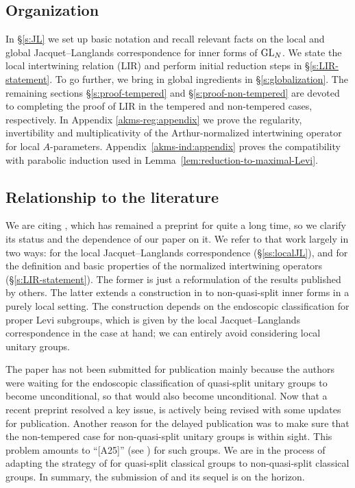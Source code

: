 \documentclass[11pt,reqno]{amsart}
\theoremstyle{plain}
\theoremstyle{definition}
\newcommand{\GL}{\tu{GL}}
\newcommand{\tu}{\textup}
\numberwithin{equation}{subsection}
\begin{document}
\subsection{Organization}

In \S\ref{s:JL} we set up basic notation and recall relevant facts on the local and global Jacquet--Langlands correspondence for inner forms of $\GL_N$. We state the local intertwining relation (LIR) and perform initial reduction steps in \S\ref{s:LIR-statement}. To go further, we bring in global ingredients in \S\ref{s:globalization}. The remaining sections \S\ref{s:proof-tempered} and \S\ref{s:proof-non-tempered} are devoted to completing the proof of LIR in the tempered and non-tempered cases, respectively. In Appendix \ref{akms-reg:appendix} we prove the regularity, invertibility and multiplicativity of the Arthur-normalized intertwining operator for local $A$-parameters.
Appendix~\ref{akms-ind:appendix} proves the compatibility with
parabolic induction used in Lemma~\ref{lem:reduction-to-maximal-Levi}.

\subsection{Relationship to the literature}\label{ss:literature}
We are citing \cite{KMSW}, which has remained a preprint for quite a long time, so we clarify its status and the dependence of our paper on it. We refer to that work largely in two ways: for the local Jacquet--Langlands correspondence (\S\ref{ss:localJL}), and for the definition and basic properties of the normalized intertwining operators (\S\ref{s:LIR-statement}). The former is just a reformulation of the results published by others. The latter extends a construction in \cite[Ch.2]{Arthur} to non-quasi-split inner forms in a purely local setting. The construction depends on the endoscopic classification for proper Levi subgroups, which is given by the local Jacquet--Langlands correspondence in the case at hand; we can entirely avoid considering local unitary groups.

The paper \cite{KMSW} has not been submitted for publication mainly because the authors were waiting for the endoscopic classification of quasi-split unitary groups \cite{Mok} to become unconditional, so that \cite{KMSW} would also become unconditional. Now that a recent preprint \cite{AGIKMS} resolved a key issue, \cite{KMSW} is actively being revised with some updates for publication. Another reason for the delayed publication was to make sure that the non-tempered case for non-quasi-split unitary groups is within sight. This problem amounts to ``[A25]'' (see \cite{AGIKMS}) for such groups. We are in the process of adapting the strategy of \cite{AGIKMS} for quasi-split classical groups to non-quasi-split classical groups. In summary, the submission of \cite{KMSW} and its sequel is on the horizon.
\end{document}
